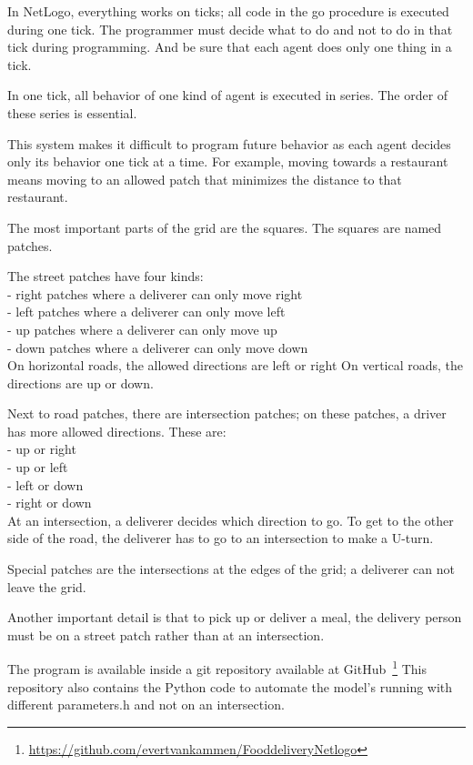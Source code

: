 In NetLogo, everything works on ticks; all code in the go procedure is executed during one tick.
The programmer must decide what to do and not to do in that tick during programming.
And be sure that each agent does only one thing in a tick.

In one tick, all behavior of one kind of agent is executed in series.
The order of these series is essential.

This system makes it difficult to program future behavior as each agent decides only its behavior one tick at a time.
For example, moving towards a restaurant means moving to an allowed patch that minimizes the distance to that restaurant.

The most important parts of the grid are the squares.
The squares are named patches.

The street patches have four kinds:\\
- right patches where a deliverer can only move right\\
- left patches where a deliverer can only move left\\
- up patches where a deliverer can only move up\\
- down patches where a deliverer can only move down\\

On horizontal roads, the allowed directions are left or right
On vertical roads, the directions are up or down.

Next to road patches, there are intersection patches; on these patches, a driver has more allowed directions.
These are:\\
- up or right\\
- up or left\\
- left or down\\
- right or down\\

At an intersection, a deliverer decides which direction to go.
To get to the other side of the road, the deliverer has to go to an intersection to make a U-turn.

Special patches are the intersections at the edges of the grid; a deliverer can not leave the grid.

Another important detail is that to pick up or deliver a meal, the delivery person must be on a street patch rather than at an intersection.

The program is available inside a git repository available at GitHub~\footnote{\url{https://github.com/evertvankammen/FooddeliveryNetlogo}}
This repository also contains the Python code to automate the model's running with different parameters.h and not on an intersection.
